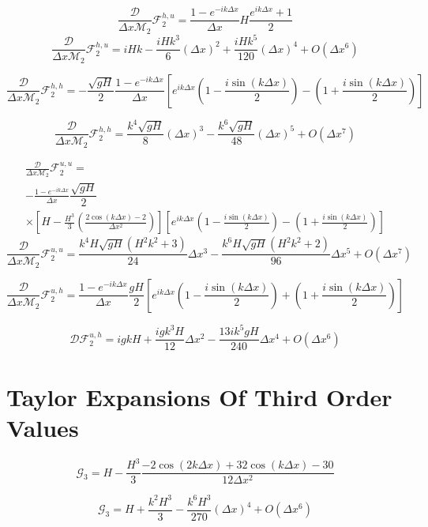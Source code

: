 \documentclass[12pt]{article}
\begin{document}
\[\frac{\mathcal{D}}{\Delta x\mathcal{M}_2}\mathcal{F}^{h,u}_2 = \frac{1 -e^{-ik\Delta x}}{\Delta x}H\frac{e^{ik\Delta x } + 1}{2}\]
\[\frac{\mathcal{D}}{\Delta x\mathcal{M}_2}\mathcal{F}^{h,u}_2 = iHk  - \frac{iHk^3}{6}( \Delta x)^2 + \frac{iHk^5}{120}( \Delta x)^4 +  O( \Delta x^6)\]


\[\frac{\mathcal{D}}{\Delta x\mathcal{M}_2} \mathcal{F}^{h,h}_2 = -\dfrac{ \sqrt{gH}}{ 2} \frac{1 -e^{-ik\Delta x}}{\Delta x} \left [ e^{ik\Delta x}\left(1  - \frac{i\sin\left(k\Delta x\right)}{2} \right)-  \left(1  + \frac{i\sin\left(k\Delta x\right)}{2} \right) \right ]\]

\[\frac{\mathcal{D}}{\Delta x\mathcal{M}_2} \mathcal{F}^{h,h}_2 = \frac{k^4\sqrt{gH} }{8} (\Delta x)^3  - \frac{k^6\sqrt{gH}}{48} (\Delta x)^5 + O(\Delta x^7) \]

\begin{multline*}
\frac{\mathcal{D}}{\Delta x\mathcal{M}_2}\mathcal{F}^{u,u}_2 = \\ - \frac{1 -e^{-ik\Delta x}}{\Delta x}\dfrac{ \sqrt{gH}}{ 2} \\ 
\times \left[H - \frac{H^3}{3}\left(\frac{ 2\cos\left(k\Delta x\right) - 2 }{\Delta x^2}\right)\right] \left[ e^{ik\Delta x}\left(1  - \frac{i\sin\left(k\Delta x\right)}{2} \right)-  \left(1  + \frac{i\sin\left(k\Delta x\right)}{2} \right) \right]
\end{multline*}
\[\frac{\mathcal{D}}{\Delta x\mathcal{M}_2}\mathcal{F}^{u,u}_2 =  \frac{ k^4 H\sqrt{gH} (H^2 k^2 +3)}{24}\Delta x^3  -\frac{ k^6 H\sqrt{gH} (H^2k^2 +2)}{96}\Delta x^5 + O(\Delta x^7)\]


\[\frac{\mathcal{D}}{\Delta x\mathcal{M}_2}\mathcal{F}^{u,h}_2 =  \frac{1 -e^{-ik\Delta x}}{\Delta x} \dfrac{ gH}{ 2} \left[ e^{ik\Delta x}\left(1  - \frac{i\sin\left(k\Delta x\right)}{2} \right) +   \left(1  + \frac{i\sin\left(k\Delta x\right)}{2} \right) \right]\]



\[\mathcal{D}\mathcal{F}_2^{u,h} = igkH + \frac{ig k^3H}{12} \Delta x^2 - \frac{13i k^5 gH}{240}  \Delta x^4 + O(\Delta x ^6)  \]

\section{Taylor Expansions Of Third Order Values }

\[\mathcal{G}_3 = H -\frac{H^3}{3} \frac{-2\cos\left(2k\Delta x\right) + 32\cos\left(k\Delta x\right)  - 30 }{12\Delta x^2}\]

\[\mathcal{G}_3 = H + \frac{ k^2H^3}{3} -\frac{ k^6 H^3}{270} (\Delta x)^4 + O(\Delta x^{6}) \]
\end{document}

